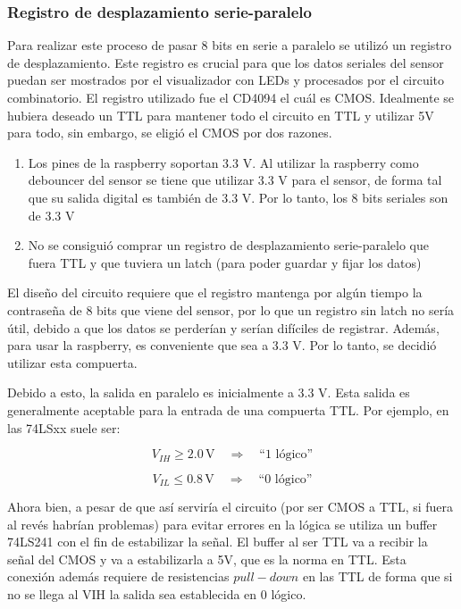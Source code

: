 \documentclass[conference]{IEEEtran}  %
\begin{document}
\subsubsection{Registro de desplazamiento serie-paralelo}

Para realizar este proceso de pasar 8 bits en serie a paralelo se utilizó un registro de desplazamiento. Este registro es crucial para que los datos seriales del sensor puedan ser mostrados por el visualizador con LEDs y procesados por el circuito combinatorio. El registro utilizado fue el CD4094 el cuál es CMOS. Idealmente se hubiera deseado un TTL para mantener todo el circuito en TTL y utilizar 5V para todo, sin embargo, se eligió el CMOS por dos razones. 

\begin{enumerate}
    \item Los pines de la raspberry soportan 3.3 V. Al utilizar la raspberry como debouncer del sensor se tiene que utilizar 3.3 V para el sensor, de forma tal que su salida digital es también de 3.3 V. Por lo tanto, los 8 bits seriales son de 3.3 V
    \item No se consiguió comprar un registro de desplazamiento serie-paralelo que fuera TTL y que tuviera un latch (para poder guardar y fijar los datos)
\end{enumerate}

El diseño del circuito requiere que el registro mantenga por algún tiempo la contraseña de 8 bits que viene del sensor, por lo que un registro sin latch no sería útil, debido a que los datos se perderían y serían difíciles de registrar. Además, para usar la raspberry, es conveniente que sea a 3.3 V. Por lo tanto, se decidió utilizar esta compuerta.

Debido a esto, la salida en paralelo es inicialmente a 3.3 V. Esta salida es generalmente aceptable para la entrada de una compuerta TTL. Por ejemplo, en las 74LSxx suele ser:

\[
V_{IH} \geq 2.0 \,\text{V} \quad \Rightarrow \quad \text{``1 lógico''}
\]

\[
V_{IL} \leq 0.8 \,\text{V} \quad \Rightarrow \quad \text{``0 lógico''}
\]

Ahora bien, a pesar de que así serviría el circuito (por ser CMOS a TTL, si fuera al revés habrían problemas) para evitar errores en la lógica se utiliza un buffer 74LS241 con el fin de estabilizar la señal. El buffer al ser TTL va a recibir la señal del CMOS y va a estabilizarla a 5V, que es la norma en TTL. Esta conexión además requiere de resistencias $pull-down$ en las TTL de forma que si no se llega al VIH la salida sea establecida en 0 lógico. 
\end{document}
